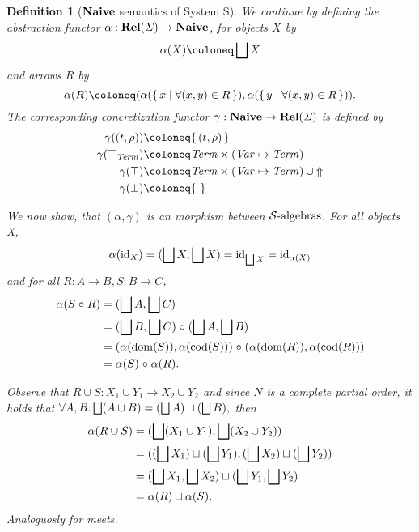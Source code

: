 \documentclass{article}
\newtheorem{definition}[theorem]{Definition}
\newcommand{\dom}{\ensuremath \operatorname{dom}}
\newcommand{\cod}{\ensuremath \operatorname{cod}}
\newcommand{\Term}{\ensuremath \mathit{Term}}
\newcommand{\Fail}{\ensuremath \text{$\Uparrow$}}
\newcommand{\Var}{\ensuremath \mathit{Var}}
\newcommand{\Env}{\ensuremath \Var \mapsto \Term}
\newcommand{\Cat}[1]{\ensuremath \mathbf{#1}}
\newcommand{\State}{\ensuremath \mathit{\Sigma} }
\newcommand{\setbuild}[2]{\ensuremath \{\, #1 \mid #2 \,\}}
\newcommand{\setbuildc}[1]{\ensuremath \{\, #1 \,\}}
\newcommand{\id}{\ensuremath \operatorname{id}}
\newcommand{\Rel}{\ensuremath \Cat{Rel}}
\newcommand{\Naive}{\ensuremath \Cat{Naive}}
\newcommand{\lub}{\ensuremath \bigsqcup}
\newcommand{\SAlgebras}{\ensuremath \mathcal{S}\text{-algebras}}
\newcommand{\ttop}{\ensuremath \top_{\Term}}
\newcommand{\comp}{\ensuremath \mathrel{\circ}}
\begin{document}
\begin{definition}[$\Naive$ semantics of System S]
  We continue by defining the abstraction functor $\alpha : \Rel(\State) \rightarrow \Naive$, for objects $X$ by \[\alpha(X) \coloneq \lub X \] and arrows $R$ by \[\alpha(R) \coloneq (\alpha(\setbuild{ x }{ \forall (x,y) \in R }), \alpha(\setbuild{ y }{ \forall (x,y) \in R})). \] The corresponding concretization functor $\gamma : \Naive \rightarrow \Rel(\State)$ is defined by
  \begin{align*}
    \gamma((t,\rho)) &\coloneq \setbuildc{ (t,\rho) } \\
    \gamma(\ttop) &\coloneq \Term \times (\Env) \\
    \gamma(\top) &\coloneq \Term \times (\Env) \cup \Fail \\
    \gamma(\bot) &\coloneq \setbuildc{} \\
  \end{align*}

  We now show, that $(\alpha,\gamma)$ is an morphism between $\SAlgebras$. For all objects X,
  \begin{align*}
    \alpha(\id_X) = (\lub X, \lub X) = \id_{\lub X} = \id_{\alpha(X)}
  \end{align*}
  and for all $R : A \rightarrow B, S : B \rightarrow C$,
  \begin{align*}
    \alpha(S \comp R) &= (\lub A, \lub C) \\
                      &= (\lub B, \lub C) \comp (\lub A, \lub B) \\
                      &= (\alpha(\dom(S)), \alpha(\cod(S))) \comp (\alpha(\dom(R)), \alpha(\cod(R))) \\
                      &= \alpha(S) \comp \alpha(R).
  \end{align*}

  Observe that $R \cup S : X_1 \cup Y_1 \rightarrow X_2 \cup Y_2$ and since $N$ is a complete partial order, it holds that $\forall A,B. \lub(A \cup B) = (\lub A) \sqcup (\lub B),$ then
 \begin{align*}
    \alpha(R \cup S) &= (\lub(X_1 \cup Y_1),\lub(X_2\cup Y_2)) \\
                     &= ((\lub X_1) \sqcup (\lub Y_1), (\lub X_2) \sqcup (\lub Y_2)) \\
                     &= (\lub X_1,\lub X_2) \sqcup (\lub Y_1, \lub Y_2) \\
                     &= \alpha(R) \sqcup \alpha(S).
 \end{align*}
 Analoguosly for meets.
\end{definition}

\end{document}
